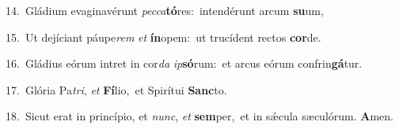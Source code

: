 {\numbfont\textcolor{\numbcolor}{14.}}~Gládium evaginavérunt \textit{pec}\-\textit{ca}\textbf{tó}res:~\star intendérunt arcum \textbf{su}\-um,\par
{\numbfont\textcolor{\numbcolor}{15.}}~Ut dejíciant páupe\textit{rem} \textit{et} \textbf{ín}\-opem:~\star ut trucídent rectos \textbf{cor}\-de.\par
{\numbfont\textcolor{\numbcolor}{16.}}~Gládius eórum intret in cor\textit{da} \textit{ip}\-\textbf{só}rum:~\star et arcus eórum confrin\-\textbf{gá}\-tur.\par
{\numbfont\textcolor{\numbcolor}{17.}}~Glória Pa\-\textit{tri}\-, \textit{et} \textbf{Fí}\-lio,~\star et Spirítui \textbf{Sanc}\-to.\par
{\numbfont\textcolor{\numbcolor}{18.}}~Sicut erat in princípio, et \textit{nunc}\-, \textit{et} \textbf{sem}\-per,~\star et in sǽcula sæculórum. \textbf{A}\-men.\par
